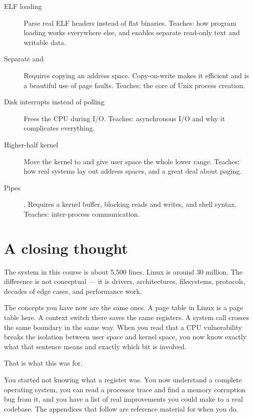 \begin{description}
  \item[ELF loading] Parse real ELF headers instead of flat binaries. Teaches: how program loading
    works everywhere else, and enables separate read-only text and writable data.
  \item[Separate  and ] Requires copying an address space. Copy-on-write makes
    it efficient and is a beautiful use of page faults. Teaches: the core of Unix process creation.
  \item[Disk interrupts instead of polling] Frees the CPU during I/O. Teaches: asynchronous I/O and
    why it complicates everything.
  \item[Higher-half kernel] Move the kernel to  and give user space the whole lower
    range. Teaches: how real systems lay out address spaces, and a great deal about paging.
  \item[Pipes] . Requires a kernel buffer, blocking reads and writes, and shell
    syntax. Teaches: inter-process communication.
\end{description}

\section{A closing thought}

The system in this course is about 5,500 lines. Linux is around 30 million. The difference is not
conceptual --- it is drivers, architectures, filesystems, protocols, decades of edge cases, and
performance work.

The concepts you have now are the same ones. A page table in Linux is a page table here. A context
switch there saves the same registers. A system call crosses the same boundary in the same way. When
you read that a CPU vulnerability breaks the isolation between user space and kernel space, you now
know exactly what that sentence means and exactly which bit is involved.

That is what this was for.

\begin{summary}
You started not knowing what a register was. You now understand a complete operating system, you
can read a processor trace and find a memory corruption bug from it, and you have a list of real
improvements you could make to a real codebase. The appendices that follow are reference material
for when you do.
\end{summary}
